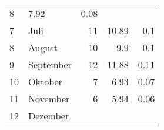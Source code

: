 \begin{longtable}{lXrrr}
       \num{8} &
       \num[round-mode=places,round-precision=2]{7.92} &
         \num[round-mode=places,round-precision=2]{0.08} \\

     7 &
     \multicolumn{1}{X}{ Juli   } &


       \num{11} &
       \num[round-mode=places,round-precision=2]{10.89} &
         \num[round-mode=places,round-precision=2]{0.1} \\

     8 &
     \multicolumn{1}{X}{ August   } &


       \num{10} &
       \num[round-mode=places,round-precision=2]{9.9} &
         \num[round-mode=places,round-precision=2]{0.1} \\

     9 &
     \multicolumn{1}{X}{ September   } &


       \num{12} &
       \num[round-mode=places,round-precision=2]{11.88} &
         \num[round-mode=places,round-precision=2]{0.11} \\

     10 &
     \multicolumn{1}{X}{ Oktober   } &


       \num{7} &
       \num[round-mode=places,round-precision=2]{6.93} &
         \num[round-mode=places,round-precision=2]{0.07} \\

     11 &
     \multicolumn{1}{X}{ November   } &


       \num{6} &
       \num[round-mode=places,round-precision=2]{5.94} &
         \num[round-mode=places,round-precision=2]{0.06} \\

     12 &
     \multicolumn{1}{X}{ Dezember   } &



\end{longtable}
